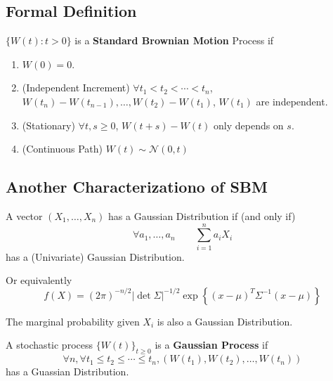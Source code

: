     \subsection{Formal Definition}
        \begin{definition}\label{Def:BrownianMotionStd}
            $\{W(t):t>0\}$ is a \textbf{Standard Brownian Motion} Process if
            \begin{enumerate}
                \item $W(0) = 0$.
                \item (Independent Increment) $\forall t_1 < t_2 < \cdots < t_n$, $W(t_n)-W(t_{n-1}), \dots, W(t_2)-W(t_1)$, $W(t_1)$ are independent.
                \item (Stationary) $\forall t,s \ge 0$, $W(t+s) - W(t)$ only depends on $s$.
                \item (Continuous Path) $W(t) \sim \mathcal{N}(0, t)$
            \end{enumerate}
        \end{definition}

    \subsection{Another Characterizationo of SBM}
        \begin{definition}
            A vector $(X_1, \dots, X_n)$ has a Gaussian Distribution if (and only if)
            \[ \forall a_1, \dots, a_n \qquad \sum_{i=1}^n a_iX_i \]
            has a (Univariate) Gaussian Distribution.

            Or equivalently
            \[ f(X) = (2\pi)^{-n/2}|\det\Sigma|^{-1/2}\exp\left\{(x-\mu)^T\Sigma^{-1}(x-\mu)\right\} \]
        \end{definition}
        \begin{remark}
            The marginal probability given $X_i$ is also a Gaussian Distribution.
        \end{remark}

        \begin{definition}\label{Def:GaussianProcess}
            A stochastic process $\{W(t)\}_{t \ge 0}$ is a \textbf{Gaussian Process} if
            \[ \forall n, \forall t_1 \le t_2 \le \cdots \le t_n, (W(t_1), W(t_2), \dots, W(t_n))\]
            has a Guassian Distribution.
        \end{definition}


